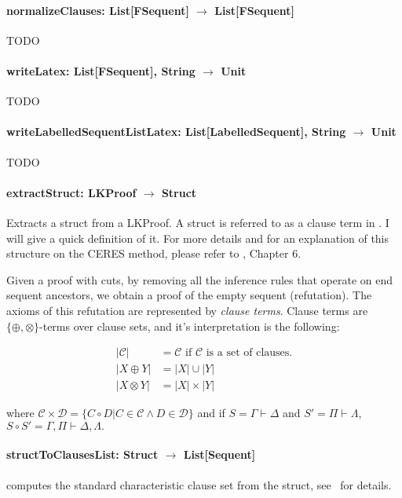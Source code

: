 \documentclass[a4paper,11pt]{article}
\begin{document}
\begin{appendix}
\paragraph{\textbf{normalizeClauses: List[FSequent] $\rightarrow$ List[FSequent]}}
{\color{red}TODO}

\paragraph{\textbf{writeLatex: List[FSequent], String $\rightarrow$ Unit}}
{\color{red}TODO}

\paragraph{\textbf{writeLabelledSequentListLatex: List[LabelledSequent], String $\rightarrow$ Unit}}
{\color{red}TODO}

\paragraph{\textbf{extractStruct: LKProof $\rightarrow$ Struct}}
Extracts a struct from a LKProof. A struct is referred to as a clause term in
\cite{Baaz2011}. I will give a quick definition of it. For more details and
for an explanation of this structure on the CERES method, please refer to
\cite{Baaz2011}, Chapter 6.

Given a proof with cuts, by removing all the inference rules that operate on end
sequent ancestors, we obtain a proof of the empty sequent (refutation). The
axioms of this refutation are represented by \textit{clause terms}. Clause
terms are $\{\oplus, \otimes\}$-terms over clause sets, and it's interpretation
is the following:

\begin{align*}
  |\mathcal{C}| &= \mathcal{C} \text{ if $\mathcal{C}$ is a set of clauses.}\\
   |X \oplus Y| &= |X| \cup |Y|\\
  |X \otimes Y| &= |X| \times |Y|
\end{align*}

where $\mathcal{C} \times \mathcal{D} = \{ C \circ D | C \in \mathcal{C} \wedge
D \in \mathcal{D}\}$ and if $S = \Gamma \vdash \Delta$ and $S' = \Pi \vdash
\Lambda$, $S \circ S' = \Gamma, \Pi \vdash \Delta, \Lambda.$

\paragraph{\textbf{structToClausesList: Struct $\rightarrow$ List[Sequent]}} computes
the standard characteristic clause set
from the struct, see~\cite[Section 4.2.1]{WoltzenlogelPaleo09General} for details.


\end{appendix}
\end{document}
